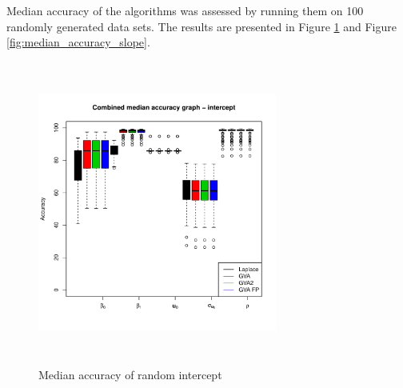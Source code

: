 \documentclass{article}[12pt]
\begin{document}
	
	\noindent Median accuracy of the algorithms was assessed by running them on 100 randomly generated data sets. The	results are presented in Figure \ref{fig:median_accuracy_intercept} and Figure
	\ref{fig:median_accuracy_slope}.
	
	\begin{figure}
		\begin{center}
			\includegraphics[width=0.7\textwidth, height=100mm]{code/results/median_accuracy_combined_intercept.pdf}
			\caption{Median accuracy of random intercept}
			\label{fig:median_accuracy_intercept}
		\end{center}
	\end{figure}
	
\end{document}
